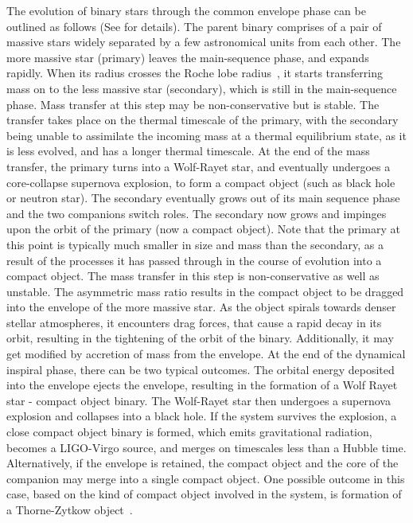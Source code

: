 The evolution of binary stars through the common envelope phase can be outlined as follows (See \cite{Postnov:2014tza,2013A&ARv..21...59I,Mandel:2018hfr} for details). The parent binary comprises of a pair of massive stars widely separated by a few astronomical units from each other. The more massive star (primary) leaves the main-sequence phase, and expands rapidly. When its radius crosses the Roche lobe radius~\cite{1983ApJ...268..368E}, it starts transferring mass on to the less massive star (secondary), which is still in the main-sequence phase. Mass transfer at this step may be non-conservative but is stable. The transfer takes place on the thermal timescale of the primary, with the secondary being unable to assimilate the incoming mass at a thermal equilibrium state, as it is less evolved, and has a longer thermal timescale. At the end of the mass transfer, the primary turns into a Wolf-Rayet star, and eventually undergoes a core-collapse supernova explosion, to form a compact object (such as black hole or neutron star). %
The secondary eventually grows out of its main sequence phase and the two companions switch roles. The secondary now grows and impinges upon the orbit of the primary (now a compact object). Note that the primary at this point is typically much smaller in size and mass than the secondary, as a result of the processes it has passed through in the course of evolution into a compact object. The mass transfer in this step is non-conservative as well as unstable. The asymmetric mass ratio results in the compact object to be dragged into the envelope of the more massive star. As the object spirals towards denser stellar atmospheres, it encounters drag forces, that cause a rapid decay in its orbit, resulting in the tightening of the orbit of the binary. Additionally, it may get modified by accretion of mass from the envelope. At the end of the dynamical inspiral phase, there can be two typical outcomes. The orbital energy deposited into the envelope ejects the envelope, resulting in the formation of a Wolf Rayet star - compact object binary. The Wolf-Rayet star then undergoes a supernova explosion and collapses into a black hole. If the system survives the explosion, a close compact object binary is formed, which emits gravitational radiation, becomes a LIGO-Virgo source, and merges on timescales less than a Hubble time. Alternatively, if the envelope is retained, the compact object and the core of the companion may merge into a single compact object. One possible outcome in this case, based on the kind of compact object involved in the system, is formation of a Thorne-Zytkow object~\cite{1977ApJ...212..832T,2014MNRAS.443L..94L}.

